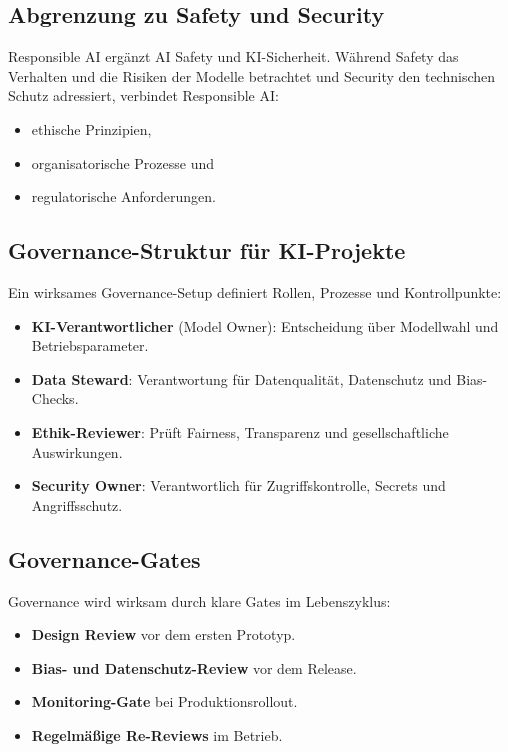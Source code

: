 \subsection{Abgrenzung zu Safety und Security}

Responsible AI ergänzt AI Safety und KI-Sicherheit. Während Safety das Verhalten und die Risiken der Modelle betrachtet und Security den technischen Schutz adressiert, verbindet Responsible AI:

\begin{itemize}[leftmargin=*]
     \item ethische Prinzipien,
     \item organisatorische Prozesse und
     \item regulatorische Anforderungen.
\end{itemize}

\subsection{Governance-Struktur für KI-Projekte}

Ein wirksames Governance-Setup definiert Rollen, Prozesse und Kontrollpunkte:

\begin{itemize}[leftmargin=*]
     \item \textbf{KI-Verantwortlicher} (Model Owner): Entscheidung über Modellwahl und Betriebsparameter.
     \item \textbf{Data Steward}: Verantwortung für Datenqualität, Datenschutz und Bias-Checks.
     \item \textbf{Ethik-Reviewer}: Prüft Fairness, Transparenz und gesellschaftliche Auswirkungen.
     \item \textbf{Security Owner}: Verantwortlich für Zugriffskontrolle, Secrets und Angriffsschutz.
\end{itemize}


\subsection{Governance-Gates}

Governance wird wirksam durch klare Gates im Lebenszyklus:

\begin{itemize}[leftmargin=*]
     \item \textbf{Design Review} vor dem ersten Prototyp.
     \item \textbf{Bias- und Datenschutz-Review} vor dem Release.
     \item \textbf{Monitoring-Gate} bei Produktionsrollout.
     \item \textbf{Regelmäßige Re-Reviews} im Betrieb.
\end{itemize}

